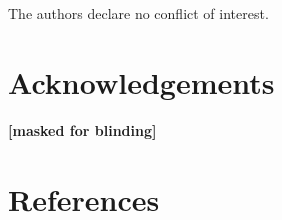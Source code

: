 \documentclass[
  man,mask,floatsintext]{apa6}
\begin{document}
The authors declare no conflict of interest.

\hypertarget{acknowledgements}{%
\section{Acknowledgements}\label{acknowledgements}}

\textbf{{[}masked for blinding{]}}

\newpage

\hypertarget{references}{%
\section{References}\label{references}}

\begingroup
\setlength{\parindent}{-0.5in}
\setlength{\leftskip}{0.5in}
\end{document}
